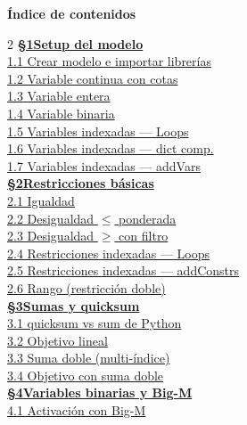 \documentclass[10pt,a4paper]{article}
\begin{document}
\begin{tcolorbox}[
    colback=sectionbg!8, colframe=sectionbg!35,
    sharp corners, boxrule=0.4pt,
    left=8pt, right=8pt, top=5pt, bottom=5pt,
]
{\small\bfseries\sffamily\textcolor{sectionbg}{\'{I}ndice de contenidos}}\\[1pt]
\begin{multicols}{2}
\setlength{\columnseprule}{0.3pt}
\footnotesize\setlength{\parskip}{1pt}
\hyperlink{sec1}{\textbf{\S1\enspace Setup del modelo}}\\
\quad\hyperlink{e11}{1.1 Crear modelo e importar librer\'ias}\\
\quad\hyperlink{e12}{1.2 Variable continua con cotas}\\
\quad\hyperlink{e13}{1.3 Variable entera}\\
\quad\hyperlink{e14}{1.4 Variable binaria}\\
\quad\hyperlink{e15}{1.5 Variables indexadas --- Loops}\\
\quad\hyperlink{e16}{1.6 Variables indexadas --- dict comp.}\\
\quad\hyperlink{e17}{1.7 Variables indexadas --- addVars}\\[3pt]
\hyperlink{sec2}{\textbf{\S2\enspace Restricciones b\'asicas}}\\
\quad\hyperlink{e21}{2.1 Igualdad}\\
\quad\hyperlink{e22}{2.2 Desigualdad $\leq$ ponderada}\\
\quad\hyperlink{e23}{2.3 Desigualdad $\geq$ con filtro}\\
\quad\hyperlink{e24}{2.4 Restricciones indexadas --- Loops}\\
\quad\hyperlink{e25}{2.5 Restricciones indexadas --- addConstrs}\\
\quad\hyperlink{e26}{2.6 Rango (restricci\'on doble)}\\[3pt]
\hyperlink{sec3}{\textbf{\S3\enspace Sumas y quicksum}}\\
\quad\hyperlink{e31}{3.1 quicksum vs sum de Python}\\
\quad\hyperlink{e32}{3.2 Objetivo lineal}\\
\quad\hyperlink{e33}{3.3 Suma doble (multi-\'indice)}\\
\quad\hyperlink{e34}{3.4 Objetivo con suma doble}\\[3pt]
\hyperlink{sec4}{\textbf{\S4\enspace Variables binarias y Big-M}}\\
\quad\hyperlink{e41}{4.1 Activaci\'on con Big-M}\\

\end{multicols}
\end{tcolorbox}
\end{document}
